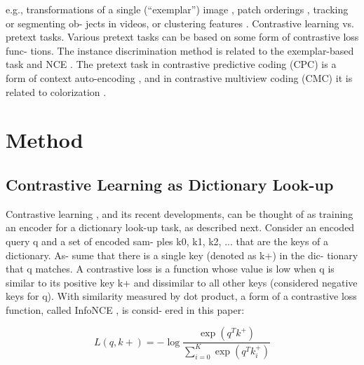 \documentclass[10pt,twocolumn]{article}  %
\begin{document}
e.g., transformations of a single (“exemplar”) image \cite{17_dosovitskiy2014discriminative},
patch orderings \cite{13_doersch2015unsupervised, 45_noroozi2016unsupervised}, tracking \cite{59_wang2015unsupervised} or segmenting ob-
jects \cite{47_pathak2017learning} in videos, or clustering features \cite{3_caron2018deep, 4_caron2019unsupervised}.
Contrastive learning vs. pretext tasks. Various pretext
tasks can be based on some form of contrastive loss func-
tions. The instance discrimination method \cite{61_wu2018unsupervised} is related
to the exemplar-based task \cite{17_dosovitskiy2014discriminative} and NCE \cite{28_gutmann2010noise}. The pretext
task in contrastive predictive coding (CPC) \cite{46_oord2018representation} is a form
of context auto-encoding \cite{48_pathak2016context}, and in contrastive multiview
coding (CMC) \cite{56_tian2019contrastive} it is related to colorization \cite{64_zhang2016colorful}.

\section{Method}
\subsection{Contrastive Learning as Dictionary Look-up}
\hspace{1em} Contrastive learning \cite{29_hadsell2006dimensionality}, and its recent developments,
can be thought of as training an encoder for a dictionary
look-up task, as described next.
Consider an encoded query q and a set of encoded sam-
ples {k0, k1, k2, ...} that are the keys of a dictionary. As-
sume that there is a single key (denoted as k+) in the dic-
tionary that q matches. A contrastive loss \cite{29_hadsell2006dimensionality} is a function
whose value is low when q is similar to its positive key k+
and dissimilar to all other keys (considered negative keys
for q). With similarity measured by dot product, a form of
a contrastive loss function, called InfoNCE \cite{46_oord2018representation}, is consid-
ered in this paper:

\begin{equation}
    L(q, k+) = -\log\frac{\exp(q^T k^+)}{\sum_{i=0}^K \exp(q^T k_i^+)}
    \label{eq:equation1}
\end{equation}
\end{document}
